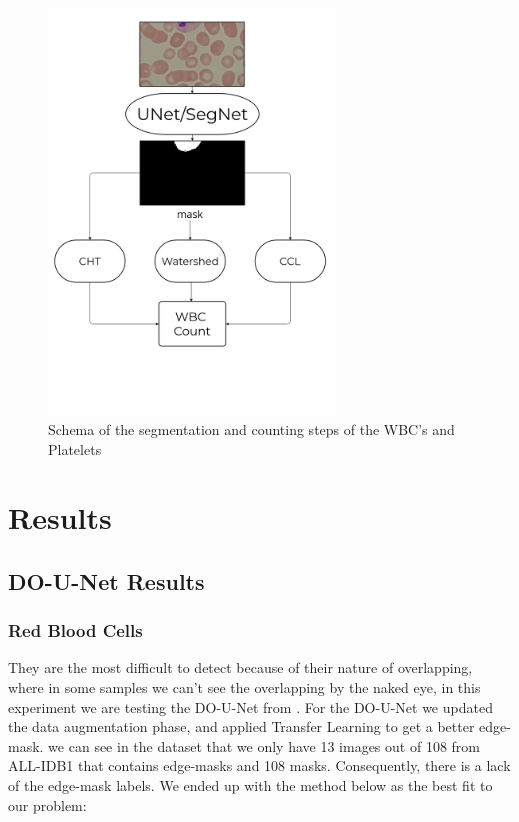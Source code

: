 \documentclass[conference]{IEEEtran}
\begin{document}
\begin{figure}[H]
\centering
    \centerline{\includegraphics[width = 3in]{images/Diag_WBC_PLT_UNET_SegNet.png}}
    \caption{Schema of the segmentation and counting steps of the WBC's and Platelets}
    \label{fig:scheme_WBC_PLT}
\end{figure}

\section{Results}
\subsection{DO-U-Net Results}
\subsubsection{Red Blood Cells}
\hspace{\parindent}
They are the most difficult to detect because of their nature of overlapping, where in some samples we can't see the overlapping by the naked eye, in this experiment we are testing the DO-U-Net from \cite{10.1007/978-3-030-44584-3_31}.
For the DO-U-Net we updated the data augmentation phase, and applied Transfer Learning to get a better edge-mask. we can see in the dataset that we only have 13 images out of 108 from ALL-IDB1 that contains edge-masks and 108 masks. Consequently, there is a lack of the edge-mask labels.
We ended up with the method below as the best fit to our problem:
\end{document}
